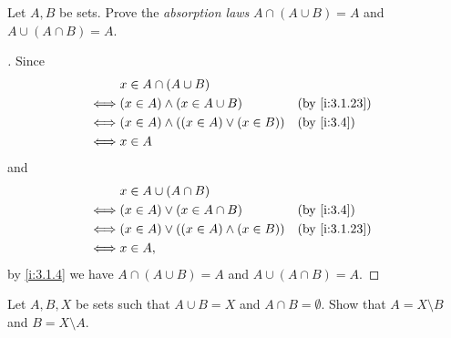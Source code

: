 \begin{ex}\label{i:ex:3.1.8}
  Let \(A, B\) be sets.
  Prove the \emph{absorption laws} \(A \cap (A \cup B) = A\) and \(A \cup (A \cap B) = A\).
\end{ex}

\begin{proof}[]
  Since
  \begin{align*}
         & x \in A \cap (A \cup B)                                       \\
    \iff & (x \in A) \land (x \in A \cup B)           &  & \by{i:3.1.23} \\
    \iff & (x \in A) \land ((x \in A) \lor (x \in B)) &  & \by{i:3.4}    \\
    \iff & x \in A
  \end{align*}
  and
  \begin{align*}
         & x \in A \cup (A \cap B)                                       \\
    \iff & (x \in A) \lor (x \in A \cap B)            &  & \by{i:3.4}    \\
    \iff & (x \in A) \lor ((x \in A) \land (x \in B)) &  & \by{i:3.1.23} \\
    \iff & x \in A,
  \end{align*}
  by \cref{i:3.1.4} we have \(A \cap (A \cup B) = A\) and \(A \cup (A \cap B) = A\).
\end{proof}

\begin{ex}\label{i:ex:3.1.9}
  Let \(A, B, X\) be sets such that \(A \cup B = X\) and \(A \cap B = \emptyset\).
  Show that \(A = X \setminus B\) and \(B = X \setminus A\).
\end{ex}

